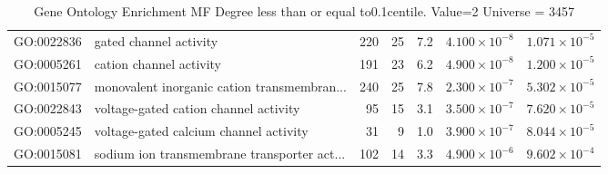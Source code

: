 \begin{table}[ht]
\begin{adjustbox}{max width=\textwidth}
\begin{tabular}{llrrrrr}
  GO:0022836 & gated channel activity & 220 & 25 & 7.2 & $4.100 \times 10^{-8}$ & $1.071 \times 10^{-5}$ \\ 
  GO:0005261 & cation channel activity & 191 & 23 & 6.2 & $4.900 \times 10^{-8}$ & $1.200 \times 10^{-5}$ \\ 
  GO:0015077 & monovalent inorganic cation transmembran... & 240 & 25 & 7.8 & $2.300 \times 10^{-7}$ & $5.302 \times 10^{-5}$ \\ 
  GO:0022843 & voltage-gated cation channel activity & 95 & 15 & 3.1 & $3.500 \times 10^{-7}$ & $7.620 \times 10^{-5}$ \\ 
  GO:0005245 & voltage-gated calcium channel activity & 31 & 9 & 1.0 & $3.900 \times 10^{-7}$ & $8.044 \times 10^{-5}$ \\ 
  GO:0015081 & sodium ion transmembrane transporter act... & 102 & 14 & 3.3 & $4.900 \times 10^{-6}$ & $9.602 \times 10^{-4}$ \\ 
   \hline
\end{tabular}
\end{adjustbox}
\caption{Gene Ontology Enrichment MF Degree  less than or equal to0.1centile.   Value=2 Universe = 3457} 
\label{tab:Gene Ontology Enrichment MF Degree  less than or equal to0.1centile.   Value=2 Universe = 3457}
\end{table}


